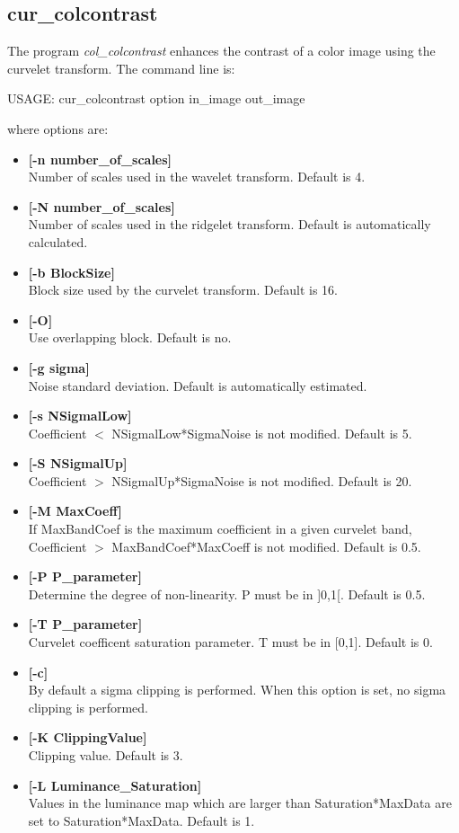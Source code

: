 \subsection{cur\_colcontrast}
The program {\em col\_colcontrast} enhances the contrast of a color image
using the curvelet transform.
The command line is:
{\bf
\begin{center}
 USAGE: cur\_colcontrast option in\_image out\_image
\end{center}}
where options are:
\begin{itemize}
\baselineskip=0.4truecm
\itemsep=0.1truecm
\item {\bf [-n number\_of\_scales]} \\
Number of scales used in the wavelet transform.
Default is 4. 
\item {\bf [-N number\_of\_scales]} \\
Number of scales used in the ridgelet transform.
Default is automatically calculated.
\item {\bf [-b BlockSize]} \\
Block size used by the curvelet transform. Default is 16.
\item {\bf [-O]} \\
Use overlapping block. Default is no.
\item {\bf [-g sigma]} \\
Noise standard deviation.  
Default is automatically estimated.
\item {\bf [-s NSigmalLow]} \\
 Coefficient $<$ NSigmalLow*SigmaNoise is not modified.
 Default is   5.
\item {\bf [-S NSigmalUp]} \\
 Coefficient $>$ NSigmalUp*SigmaNoise is not modified.
 Default is  20.
\item {\bf [-M MaxCoeff]} \\
If MaxBandCoef is the maximum coefficient in a given curvelet band,
 Coefficient $>$ MaxBandCoef*MaxCoeff is not modified.
 Default is 0.5.
 \item {\bf  [-P P\_parameter]} \\
Determine the degree of non-linearity. P must be in ]0,1[.  
Default is 0.5.
\item {\bf [-T P\_parameter]} \\
 Curvelet coefficent saturation parameter. T must be in [0,1].  
Default is 0.
\item {\bf [-c]} \\
By default a sigma clipping is performed. When this option is set, no
sigma clipping is performed.
\item {\bf [-K ClippingValue]} \\
Clipping value. Default is 3.
\item {\bf [-L Luminance\_Saturation]} \\
Values in the luminance map which are 
larger than Saturation*MaxData are set to Saturation*MaxData.
Default is  1. 
\end{itemize}

